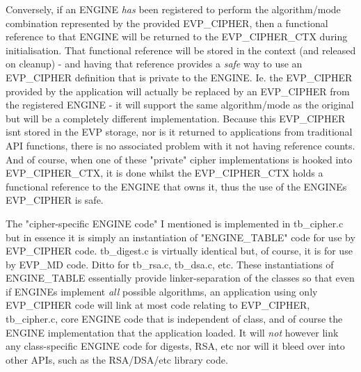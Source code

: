 Conversely, if an ENGINE {\itshape has} been registered to perform the algorithm/mode combination represented by the provided EVP\+\_\+\+CIPHER, then a functional reference to that ENGINE will be returned to the EVP\+\_\+\+CIPHER\+\_\+\+CTX during initialisation. That functional reference will be stored in the context (and released on cleanup) -\/ and having that reference provides a {\itshape safe} way to use an EVP\+\_\+\+CIPHER definition that is private to the ENGINE. Ie. the EVP\+\_\+\+CIPHER provided by the application will actually be replaced by an EVP\+\_\+\+CIPHER from the registered ENGINE -\/ it will support the same algorithm/mode as the original but will be a completely different implementation. Because this EVP\+\_\+\+CIPHER isn\textquotesingle{}t stored in the EVP storage, nor is it returned to applications from traditional API functions, there is no associated problem with it not having reference counts. And of course, when one of these "{}private"{} cipher implementations is hooked into EVP\+\_\+\+CIPHER\+\_\+\+CTX, it is done whilst the EVP\+\_\+\+CIPHER\+\_\+\+CTX holds a functional reference to the ENGINE that owns it, thus the use of the ENGINE\textquotesingle{}s EVP\+\_\+\+CIPHER is safe.

The "{}cipher-\/specific ENGINE code"{} I mentioned is implemented in tb\+\_\+cipher.\+c but in essence it is simply an instantiation of "{}\+ENGINE\+\_\+\+TABLE"{} code for use by EVP\+\_\+\+CIPHER code. tb\+\_\+digest.\+c is virtually identical but, of course, it is for use by EVP\+\_\+\+MD code. Ditto for tb\+\_\+rsa.\+c, tb\+\_\+dsa.\+c, etc. These instantiations of ENGINE\+\_\+\+TABLE essentially provide linker-\/separation of the classes so that even if ENGINEs implement {\itshape all} possible algorithms, an application using only EVP\+\_\+\+CIPHER code will link at most code relating to EVP\+\_\+\+CIPHER, tb\+\_\+cipher.\+c, core ENGINE code that is independent of class, and of course the ENGINE implementation that the application loaded. It will {\itshape not} however link any class-\/specific ENGINE code for digests, RSA, etc nor will it bleed over into other APIs, such as the RSA/\+DSA/etc library code.

